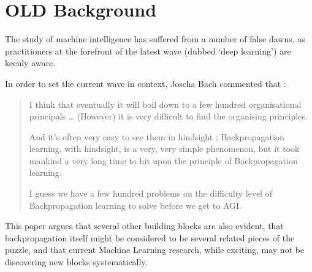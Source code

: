 \documentclass[citeauthoryear]{llncs}
\begin{document}
\newpage

\section{OLD Background}
The study of machine intelligence has suffered from a number of false dawns, 
as practitioners at the forefront of the latest wave (dubbed `deep learning') 
are keenly aware.  
%

In order to set the current wave in context, Joscha Bach \cite{Joscha-Bach-2012-interview}
commented that :

\begin{quotation}

I think that eventually it will boil down to a few hundred organisational principals
\dots
%
%
%
(However) it is very difficult to find the organising principles.

And it's often very easy to see them in hindsight : 
Backpropagation learning, with hindsight, is a very, very simple phenomenon, 
but it took mankind a very long time to hit upon the principle of Backpropagation learning. 

I guess we have a few hundred problems on the difficulty level of Backpropagation learning to solve before we get to AGI. 


\end{quotation}

This paper argues that several other building blocks are also evident, 
that backpropagation itself might be considered to be several related pieces of the puzzle,
and that current Machine Learning research, while exciting, may not be
discovering new blocks systematically.
\end{document}
